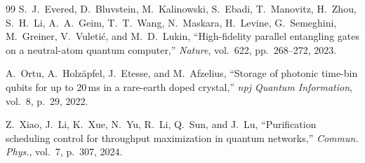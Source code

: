 \documentclass[twocolumn]{article}
\begin{document}
\begin{thebibliography}{99}
S.~J.~Evered, D.~Bluvstein, M.~Kalinowski, S.~Ebadi, T.~Manovitz,
H.~Zhou, S.~H.~Li, A.~A.~Geim, T.~T.~Wang, N.~Maskara, H.~Levine,
G.~Semeghini, M.~Greiner, V.~Vuleti\'c, and M.~D.~Lukin,
``High-fidelity parallel entangling gates on a neutral-atom quantum
computer,''
\emph{Nature}, vol.~622, pp.~268--272, 2023.

A.~Ortu, A.~Holz\"apfel, J.~Etesse, and M.~Afzelius,
``Storage of photonic time-bin qubits for up to 20\,ms in a
rare-earth doped crystal,''
\emph{npj Quantum Information}, vol.~8, p.~29, 2022.

Z.~Xiao, J.~Li, K.~Xue, N.~Yu, R.~Li, Q.~Sun, and J.~Lu,
``Purification scheduling control for throughput maximization in
quantum networks,''
\emph{Commun. Phys.}, vol.~7, p.~307, 2024.

\end{thebibliography}
\end{document}
